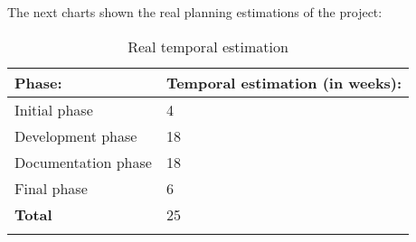The next charts shown the real planning estimations of the project:

\begin{table}[H]
  \begin{center}
    \begin{tabularx}{0.60\textwidth}{|X|X|}
      \firsthline
      \textbf{Phase:} & \textbf{Temporal estimation (in weeks):} \\
      \hline
      Initial phase & 4 \\
      \hline
      Development phase & 18 \\
      \hline
      Documentation phase & 18 \\
      \hline
      Final phase & 6 \\
      \hline
      \textbf{Total} & 25 \\
      \lasthline
    \end{tabularx}
    \caption{Real temporal estimation}
  \end{center}
\end{table}

\newpage
{}

\newpage
{}

